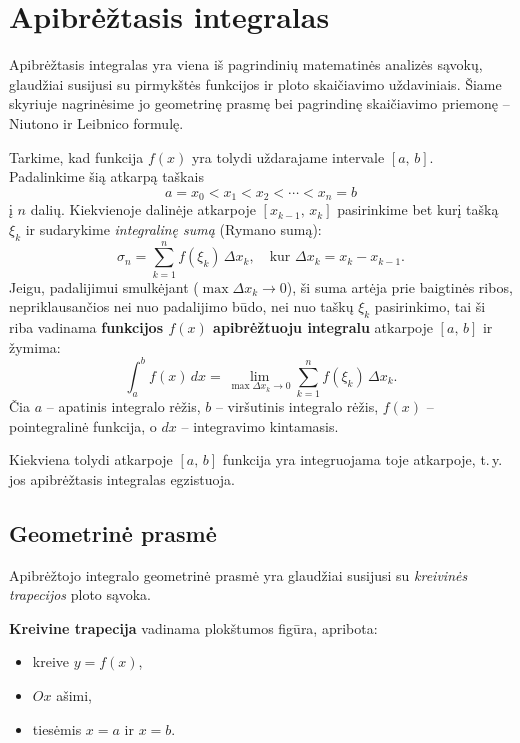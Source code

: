 \section{Apibrėžtasis integralas}

Apibrėžtasis integralas yra viena iš pagrindinių matematinės analizės sąvokų, glaudžiai susijusi su 
pirmykštės funkcijos ir ploto skaičiavimo uždaviniais. Šiame skyriuje nagrinėsime jo geometrinę 
prasmę bei pagrindinę skaičiavimo priemonę – Niutono ir Leibnico formulę.

\begin{definition}
Tarkime, kad funkcija $f(x)$ yra tolydi uždarajame intervale $[a,\,b]$. Padalinkime šią atkarpą 
taškais
\[
a = x_0 < x_1 < x_2 < \cdots < x_n = b
\]
į $n$ dalių. Kiekvienoje dalinėje atkarpoje $[x_{k-1},\, x_k]$ pasirinkime bet kurį tašką $\xi_k$ 
ir sudarykime \emph{integralinę sumą} (Rymano sumą):
\[
\sigma_n = \sum_{k=1}^{n} f(\xi_k)\,\Delta x_k, \quad \text{kur } \Delta x_k = x_k - x_{k-1}.
\]
Jeigu, padalijimui smulkėjant ($\max \Delta x_k \to 0$), ši suma artėja prie baigtinės ribos, 
nepriklausančios nei nuo padalijimo būdo, nei nuo taškų $\xi_k$ pasirinkimo, tai ši riba 
vadinama \textbf{funkcijos $f(x)$ apibrėžtuoju integralu} atkarpoje $[a,\,b]$ ir žymima:
\[
\int_a^b f(x)\,dx = \lim_{\max \Delta x_k \to 0} \sum_{k=1}^{n} f(\xi_k)\,\Delta x_k.
\]
Čia $a$ – apatinis integralo rėžis, $b$ – viršutinis integralo rėžis, $f(x)$ – pointegralinė 
funkcija, o $dx$ – integravimo kintamasis.
\end{definition}

\begin{remark}
Kiekviena tolydi atkarpoje $[a,\,b]$ funkcija yra integruojama toje atkarpoje, t.\,y. jos 
apibrėžtasis integralas egzistuoja.
\end{remark}

\subsection{Geometrinė prasmė}

Apibrėžtojo integralo geometrinė prasmė yra glaudžiai susijusi su \emph{kreivinės trapecijos} 
ploto sąvoka.

\begin{definition}
\textbf{Kreivine trapecija} vadinama plokštumos figūra, apribota:
\begin{itemize}
    \item kreive $y = f(x)$,
    \item $Ox$ ašimi,
    \item tiesėmis $x = a$ ir $x = b$.
\end{itemize}
\end{definition}

